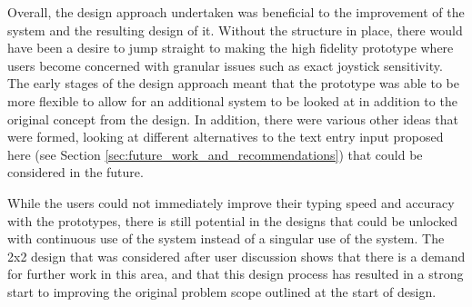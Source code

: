 \documentclass[conclusions.tex]{subfiles}
\begin{document}
Overall, the design approach undertaken was beneficial to the improvement of
the system and the resulting design of it. Without the structure in place, there
would have been a desire to jump straight to making the high fidelity prototype
where users become concerned with granular issues such as exact joystick
sensitivity. The early stages of the design approach meant that the prototype
was able to be more flexible to allow for an additional system to be looked at
in addition to the original concept from the design. In addition, there were
various other ideas that were formed, looking at different alternatives to the
text entry input proposed here (see Section
\ref{sec:future_work_and_recommendations}) that could be considered in the
future.

While the users could not immediately improve their typing speed and accuracy
with the prototypes, there is still potential in the designs that could be
unlocked with continuous use of the system instead of a singular use of the
system. The 2x2 design that was considered after user discussion shows that
there is a demand for further work in this area, and that this design process
has resulted in a strong start to improving the original problem scope outlined
at the start of design.
\end{document}
